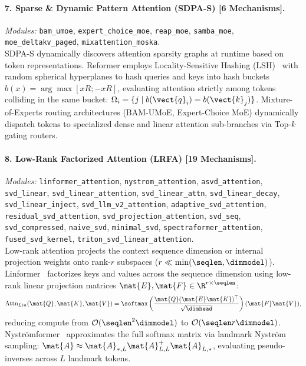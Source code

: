 \paragraph{7. Sparse \& Dynamic Pattern Attention (SDPA-S) [6 Mechanisms].}
\textit{Modules:} \texttt{bam\_umoe}, \texttt{expert\_choice\_moe}, \texttt{reap\_moe}, \texttt{samba\_moe}, \texttt{moe\_deltakv\_paged}, \texttt{mixattention\_moska}. \\
SDPA-S dynamically discovers attention sparsity graphs at runtime based on token representations. Reformer employs Locality-Sensitive Hashing (LSH)~\cite{kitaev2020reformer} with random spherical hyperplanes to hash queries and keys into hash buckets $b(x) = \arg\max [x R; -x R]$, evaluating attention strictly among tokens colliding in the same bucket: $\Omega_i = \{j \mid b(\vect{q}_i) = b(\vect{k}_j)\}$. Mixture-of-Experts routing architectures (BAM-UMoE, Expert-Choice MoE) dynamically dispatch tokens to specialized dense and linear attention sub-branches via Top-$k$ gating routers.

\paragraph{8. Low-Rank Factorized Attention (LRFA) [19 Mechanisms].}
\textit{Modules:} \texttt{linformer\_attention}, \texttt{nystrom\_attention}, \texttt{asvd\_attention}, \texttt{svd\_linear}, \texttt{svd\_linear\_attention}, \texttt{svd\_linear\_attn}, \texttt{svd\_linear\_decay}, \texttt{svd\_linear\_inject}, \texttt{svd\_llm\_v2\_attention}, \texttt{adaptive\_svd\_attention}, \texttt{residual\_svd\_attention}, \texttt{svd\_projection\_attention}, \texttt{svd\_seq}, \texttt{svd\_compressed}, \texttt{naive\_svd}, \texttt{minimal\_svd}, \texttt{spectraformer\_attention}, \texttt{fused\_svd\_kernel}, \texttt{triton\_svd\_linear\_attention}. \\
Low-rank attention projects the context sequence dimension or internal projection weights onto rank-$r$ subspaces ($r \ll \min(\seqlen, \dimmodel)$). Linformer~\cite{wang2020linformer} factorizes keys and values across the sequence dimension using low-rank linear projection matrices $\mat{E}, \mat{F} \in \R^{r \times \seqlen}$:
\begin{equation}
\operatorname{Attn}_{Lin}(\mat{Q}, \mat{K}, \mat{V}) = \softmax\left(\frac{\mat{Q} (\mat{E}\mat{K})^\top}{\sqrt{\dimhead}}\right) (\mat{F}\mat{V}),
\end{equation}
reducing compute from $\mathcal{O}(\seqlen^2 \dimmodel)$ to $\mathcal{O}(\seqlen r \dimmodel)$. Nyströmformer~\cite{xiong2021nystromformer} approximates the full softmax matrix via landmark Nyström sampling: $\mat{A} \approx \mat{A}_{*, L} \mat{A}_{L, L}^+ \mat{A}_{L, *}$, evaluating pseudo-inverses across $L$ landmark tokens.

